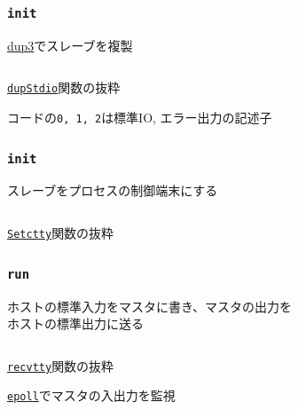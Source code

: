 \documentclass[unicode, 14pt, aspectratio=169]{beamer}
\begin{document}
\begin{frame}[t]
  \frametitle{\texttt{init}}
  \large
  \href{https://ja.manpages.org/dup3/2}{dup3}でスレーブを複製
  \normalsize
  \begin{center}
    \inputminted{go}{code/pty_init_dup.go}
    \href{https://github.com/opencontainers/runc/blob/7cb363254b69e10320360b63fb73e0ffb5da7bf2/libcontainer/console_linux.go\#L28}{\texttt{dupStdio}}関数の抜粋
  \end{center}
  コードの\texttt{0, 1, 2}は標準IO, エラー出力の記述子
\end{frame}
\begin{frame}[t]
  \frametitle{\texttt{init}}
  \large
  スレーブをプロセスの制御端末にする\supercite{ioctl}
  \normalsize
  \begin{center}
    \inputminted{go}{code/pty_tty.go}
    \href{https://github.com/opencontainers/runc/blob/7cb363254b69e10320360b63fb73e0ffb5da7bf2/libcontainer/system/linux.go\#L121}{\texttt{Setctty}}関数の抜粋
  \end{center}
\end{frame}
\begin{frame}[t]
  \frametitle{\texttt{run}}
  \large
  ホストの標準入力をマスタに書き、マスタの出力を\\ホストの標準出力に送る  
  \normalsize
  \begin{center}
    \small{\inputminted{go}{code/tty_run.go}}
    \href{https://github.com/opencontainers/runc/blob/7cb363254b69e10320360b63fb73e0ffb5da7bf2/tty.go\#L102}{\texttt{recvtty}}関数の抜粋
  \end{center}
  \href{https://man7.org/linux/man-pages/man7/epoll.7.html}{\texttt{epoll}}でマスタの入出力を監視
\end{frame}
\end{document}

